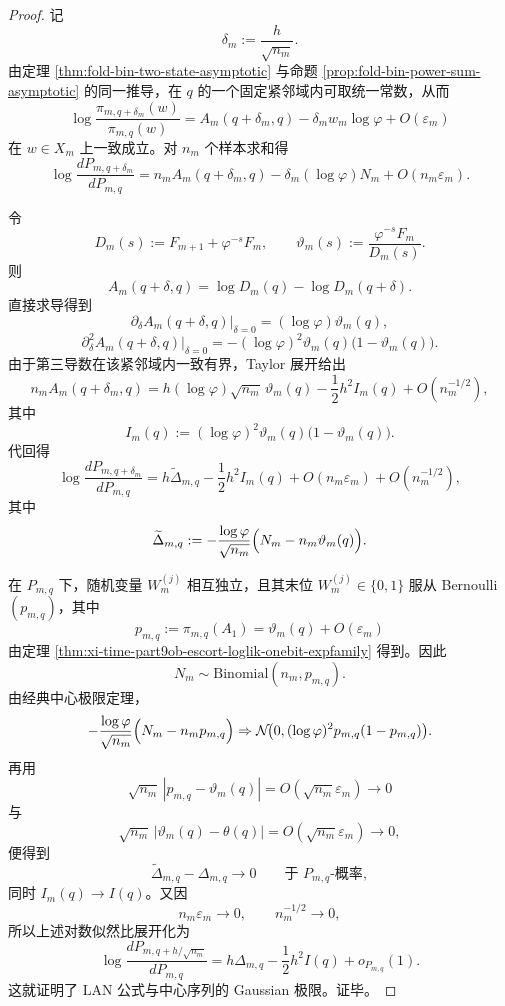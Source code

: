 \begin{proof}
记
\[
\delta_m:=\frac{h}{\sqrt{n_m}}.
\]
由定理 \ref{thm:fold-bin-two-state-asymptotic} 与命题 \ref{prop:fold-bin-power-sum-asymptotic} 的同一推导，在 \(q\) 的一个固定紧邻域内可取统一常数，从而
\[
\log\frac{\pi_{m,q+\delta_m}(w)}{\pi_{m,q}(w)}
=
A_m(q+\delta_m,q)-\delta_m w_m\log\varphi+O(\varepsilon_m)
\]
在 \(w\in X_m\) 上一致成立。对 \(n_m\) 个样本求和得
\[
\log\frac{dP_{m,q+\delta_m}}{dP_{m,q}}
=
n_mA_m(q+\delta_m,q)-\delta_m(\log\varphi)N_m
+O(n_m\varepsilon_m).
\]

令
\[
D_m(s):=F_{m+1}+\varphi^{-s}F_m,
\qquad
\vartheta_m(s):=\frac{\varphi^{-s}F_m}{D_m(s)}.
\]
则
\[
A_m(q+\delta,q)=\log D_m(q)-\log D_m(q+\delta).
\]
直接求导得到
\[
\partial_\delta A_m(q+\delta,q)\big|_{\delta=0}
=
(\log\varphi)\vartheta_m(q),
\]
\[
\partial_\delta^2 A_m(q+\delta,q)\big|_{\delta=0}
=
-(\log\varphi)^2\vartheta_m(q)\bigl(1-\vartheta_m(q)\bigr).
\]
由于第三导数在该紧邻域内一致有界，Taylor 展开给出
\[
n_mA_m(q+\delta_m,q)
=
h(\log\varphi)\sqrt{n_m}\,\vartheta_m(q)
-\frac12 h^2 I_m(q)
+O(n_m^{-1/2}),
\]
其中
\[
I_m(q):=
(\log\varphi)^2\vartheta_m(q)\bigl(1-\vartheta_m(q)\bigr).
\]
代回得
\[
\log\frac{dP_{m,q+\delta_m}}{dP_{m,q}}
=
h\widetilde\Delta_{m,q}
-\frac12 h^2 I_m(q)
+O(n_m\varepsilon_m)+O(n_m^{-1/2}),
\]
其中
\[
\widetilde\Delta_{m,q}
:=
-\frac{\log\varphi}{\sqrt{n_m}}
\Bigl(N_m-n_m\vartheta_m(q)\Bigr).
\]

在 \(P_{m,q}\) 下，随机变量 \(W^{(j)}_m\) 相互独立，且其末位 \(W^{(j)}_m\in\{0,1\}\) 服从 Bernoulli\((p_{m,q})\)，其中
\[
p_{m,q}:=\pi_{m,q}(A_1)=\vartheta_m(q)+O(\varepsilon_m)
\]
由定理 \ref{thm:xi-time-part9ob-escort-loglik-onebit-expfamily} 得到。因此
\[
N_m\sim \mathrm{Binomial}(n_m,p_{m,q}).
\]
由经典中心极限定理，
\[
-\frac{\log\varphi}{\sqrt{n_m}}
\Bigl(N_m-n_mp_{m,q}\Bigr)
\Rightarrow
\mathcal N\!\bigl(0,(\log\varphi)^2p_{m,q}(1-p_{m,q})\bigr).
\]
再用
\[
\sqrt{n_m}\,|p_{m,q}-\vartheta_m(q)|
=
O(\sqrt{n_m}\varepsilon_m)\to 0
\]
与
\[
\sqrt{n_m}\,|\vartheta_m(q)-\theta(q)|
=
O(\sqrt{n_m}\varepsilon_m)\to 0,
\]
便得到
\[
\widetilde\Delta_{m,q}-\Delta_{m,q}\to 0
\qquad\text{于 }P_{m,q}\text{-概率},
\]
同时 \(I_m(q)\to I(q)\)。又因
\[
n_m\varepsilon_m\to 0,
\qquad
n_m^{-1/2}\to 0,
\]
所以上述对数似然比展开化为
\[
\log\frac{dP_{m,q+h/\sqrt{n_m}}}{dP_{m,q}}
=
h\Delta_{m,q}
-\frac12 h^2 I(q)
+o_{P_{m,q}}(1).
\]
这就证明了 LAN 公式与中心序列的 Gaussian 极限。证毕。
\end{proof}



\endinput

